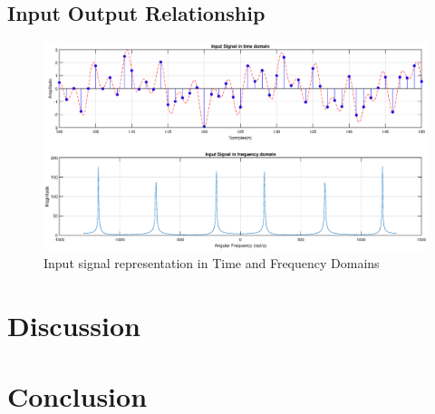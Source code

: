 \documentclass[a4paper,11pt]{article}%
\begin{document}
\subsection{Input Output Relationship}
\begin{figure}[!h]
	\centering
	\includegraphics[scale=0.4]{figures/input-signal}
	\caption{Input signal representation in Time and Frequency Domains}
\end{figure}


\section{Discussion}
\section{Conclusion}
%


\pagebreak


%
\end{document}

